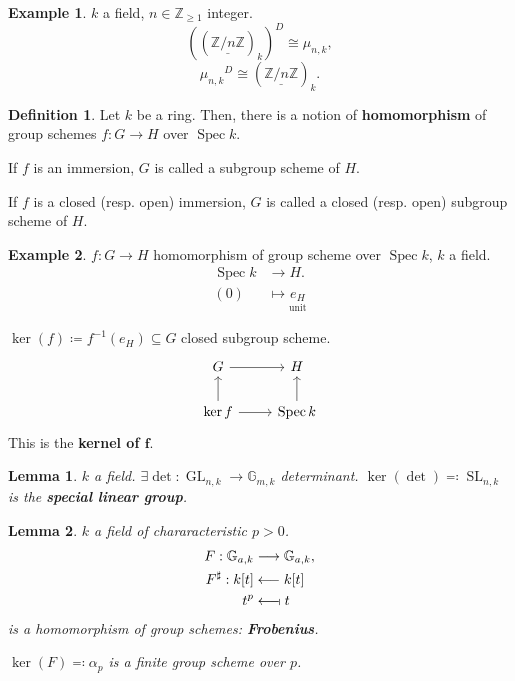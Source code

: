 \documentclass[12pt]{article}
\DeclareMathOperator{\Spec}{Spec}
\DeclareMathOperator{\GL}{GL}
\DeclareMathOperator{\SL}{SL}
\newtheorem*{lemma}{Lemma}
\theoremstyle{definition}
\newtheorem*{definition}{Definition}
\newtheorem*{example}{Example}
\theoremstyle{remark}
\begin{document}
\begin{example}
$k$ a field, $n\in\mathbb{Z}_{\geq1}$ integer.
\[\left((\underline{\mathbb{Z}/n\mathbb{Z}})_k\right)^D\cong\mu_{n,k},\]
\[{\mu_{n,k}}^D\cong(\underline{\mathbb{Z}/n\mathbb{Z}})_k.\]
\end{example}

\begin{definition}
Let $k$ be a ring. Then, there is a notion of \textbf{homomorphism} of group schemes $f:G\rightarrow H$ over $\Spec k$.

If $f$ is an immersion, $G$ is called a subgroup scheme of $H$.

If $f$ is a closed (resp. open) immersion, $G$ is called a closed (resp. open) subgroup scheme of $H$.
\end{definition}

\begin{example}
$f:G\rightarrow H$ homomorphism of group scheme over $\Spec k$, $k$ a field.
\begin{align*}
\Spec k&\longrightarrow H.\\
(0)&\longmapsto\underset{\text{unit}}{e_H}
\end{align*}

$\ker(f)\coloneqq f^{-1}(e_H)\subseteq G$ closed subgroup scheme.
\[
\begin{tikzcd}
G\arrow[r]&H\\
\ker f\arrow[u]\arrow[r]&\Spec k\arrow[u]
\end{tikzcd}
\]
This is the \textbf{kernel of $\boldsymbol{f}$}.
\end{example}

\begin{lemma}
$k$ a field. $\exists\det:\GL_{n,k}\rightarrow\mathbb{G}_{m,k}$ determinant. $\ker(\det)\eqqcolon\SL_{n,k}$ is the \textbf{special linear group}.
\end{lemma}

\begin{lemma}
$k$ a field of chararacteristic $p>0$.
\begin{align*}
F:\mathbb{G}_{a,k}&\longrightarrow\mathbb{G}_{a,k},\\
F^{\sharp}:k[t]&\longleftarrow k[t]\\
t^p&\longleftarrow\!\shortmid t
\end{align*}
is a homomorphism of group schemes: \textbf{Frobenius}.

$\ker(F)\eqqcolon\alpha_p$ is a finite group scheme over $p$.
\end{lemma}
\end{document}
